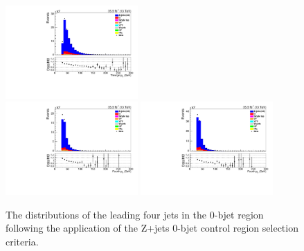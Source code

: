 \begin{figure}[!ht]
\includegraphics[width=0.45\textwidth]{figs/background-estimation/plots/unblinded/DY_control_old_prompt_mumu_ttbarInc/thirdJetPt_SingleTop_jetSel_mumu.pdf}
\\
\includegraphics[width=0.45\textwidth]{figs/background-estimation/plots/unblinded/DY_control_old_prompt_ee_ttbarInc/fourthJetPt_SingleTop_jetSel_ee.pdf}
\includegraphics[width=0.45\textwidth]{figs/background-estimation/plots/unblinded/DY_control_old_prompt_mumu_ttbarInc/fourthJetPt_SingleTop_jetSel_mumu.pdf}
\caption{
The distributions of the leading four jets \pt in the 0-bjet region following the application of the Z+jets 0-bjet control region selection criteria.
}
\label{fig:App_CR_LO_jetPt_jetSel}
\end{figure}

